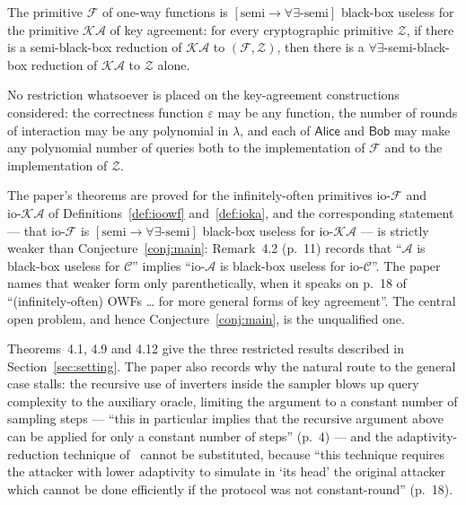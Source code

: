 \documentclass{aicr-conjecture}
\newcommand{\iopref}{\mathrm{io}\text{-}}
\newcommand{\Fc}{\mathcal{F}}
\newcommand{\KAc}{\mathcal{KA}}
\newcommand{\ioF}{\iopref\Fc}
\newcommand{\ioKA}{\iopref\KAc}
\newcommand{\Zc}{\mathcal{Z}}
\newcommand{\semibbu}{[\mathrm{semi}\to\forall\exists\text{-semi}]}
\newcommand{\Alice}{\mathsf{Alice}}
\newcommand{\Bob}{\mathsf{Bob}}
\begin{document}
\begin{conjecture}\label{conj:main}
The primitive $\Fc$ of one-way functions is $\semibbu$ black-box useless
for the primitive $\KAc$ of key agreement: for every cryptographic
primitive $\Zc$, if there is a semi-black-box reduction of $\KAc$ to
$(\Fc,\Zc)$, then there is a $\forall\exists$-semi-black-box reduction of
$\KAc$ to $\Zc$ alone.

No restriction whatsoever is placed on the key-agreement constructions
considered: the correctness function $\varepsilon$ may be any function,
the number of rounds of interaction may be any polynomial in $\lambda$,
and each of $\Alice$ and $\Bob$ may make any polynomial number of queries
both to the implementation of $\Fc$ and to the implementation of $\Zc$.
\end{conjecture}

\begin{remark}\label{rem:io}
The paper's theorems are proved for the infinitely-often primitives
$\ioF$ and $\ioKA$ of Definitions~\ref{def:ioowf} and~\ref{def:ioka}, and
the corresponding statement --- that $\ioF$ is $\semibbu$ black-box
useless for $\ioKA$ --- is strictly weaker than
Conjecture~\ref{conj:main}: Remark~4.2 (p.~11) records that
``$\mathcal A$ is black-box useless for $\mathcal C$'' implies
``$\iopref\mathcal A$ is black-box useless for $\iopref\mathcal C$''. The
paper names that weaker form only parenthetically, when it speaks on
p.~18 of ``(infinitely-often) OWFs \dots{} for more general forms of key
agreement''. The central open problem, and hence
Conjecture~\ref{conj:main}, is the unqualified one.
\end{remark}

\begin{remark}\label{rem:progress}
Theorems~4.1, 4.9 and 4.12 give the three restricted results described in
Section~\ref{sec:setting}. The paper also records why the natural route
to the general case stalls: the recursive use of inverters inside the
sampler blows up query complexity to the auxiliary oracle, limiting the
argument to a constant number of sampling steps --- ``this in particular
implies that the recursive argument above can be applied for only a
constant number of steps'' (p.~4) --- and the adaptivity-reduction
technique of~\cite{MMV11} cannot be substituted, because ``this technique
requires the attacker with lower adaptivity to simulate in `its head' the
original attacker which cannot be done efficiently if the protocol was
not constant-round'' (p.~18).
\end{remark}
\end{document}

